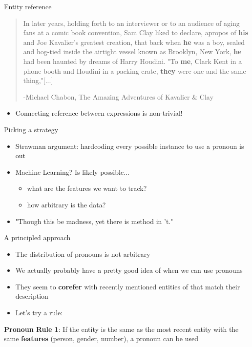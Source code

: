 \documentclass[10pt, compress]{beamer}
\begin{document}
\begin{frame}{Entity reference}
	\begin{quote}
		In later years, holding forth to an interviewer or to an audience of aging fans at a comic book convention, Sam Clay liked to declare, apropos of \textbf{his} and Joe Kavalier's greatest creation, that back when \textbf{he} was a boy, sealed and hog-tied inside the airtight vessel known as Brooklyn, New York, \textbf{he} had been haunted by dreams of Harry Houdini. "To \textbf{me}, Clark Kent in a phone booth and Houdini in a packing crate, \textbf{they} were one and the same thing,"[...]

		\medskip
		-Michael Chabon, The Amazing Adventures of Kavalier \& Clay
	\end{quote}

	\pause

	\begin{itemize}
		\item Connecting reference between expressions is non-trivial!
	\end{itemize}
\end{frame}

\begin{frame}{Picking a strategy}
	\begin{itemize}
		\item Strawman argument: hardcoding every possible instance to use a pronoun is out 	\pause
		\item Machine Learning? \pause Is likely possible...	\pause
		\begin{itemize}
			\item what are the features we want to track?
			\item how arbitrary is the data?
		\end{itemize}
		\pause
		\item "Though this be madness, yet there is method in 't."
	\end{itemize}
\end{frame}

\begin{frame}{A principled approach}
	\begin{itemize}
		\item The distribution of pronouns is not arbitrary
		\item We actually probably have a pretty good idea of when we can use pronouns \pause
		\item They seem to \textbf{corefer} with recently mentioned entities of that match their description \pause
		\item Let's try a rule:
	\end{itemize}

	\begin{exe}
		\ex \textbf{Pronoun Rule 1}: If the entity is the same as the most recent entity with the same \textbf{features} (person, gender, number), a pronoun can be used
	\end{exe}
\end{frame}
\end{document}
